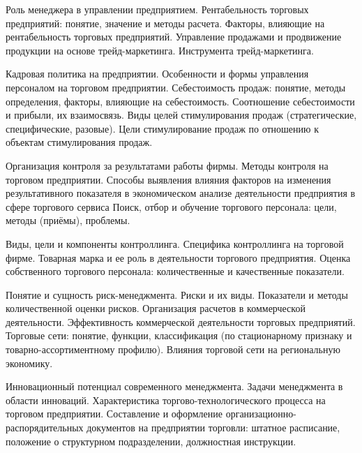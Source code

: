 \documentclass[
	11pt,
	a4paper,
	]
	{article}
\begin{document}
\bigskip

\noindent{} 
	{
		Роль менеджера в управлении предприятием.
	}{
		Рентабельность торговых предприятий: понятие, значение и методы расчета. Факторы, влияющие на рентабельность торговых предприятий.
	}{
		Управление продажами и продвижение продукции на основе трейд-маркетинга. Инструмента трейд-маркетинга.
	}

\bigskip

\noindent{} 
	{
		Кадровая политика на предприятии. Особенности и формы управления персоналом на торговом предприятии.
	}{
		Себестоимость продаж: понятие, методы определения, факторы, влияющие на себестоимость. Соотношение себестоимости и прибыли, их взаимосвязь.
	}{
		Виды целей стимулирования продаж (стратегические, специфические, разовые). Цели стимулирование продаж по отношению к объектам стимулирования продаж.
	}

\bigskip

\noindent{} 
	{
		Организация контроля за результатами работы фирмы. Методы контроля на торговом предприятии.
	}{
		Способы выявления влияния факторов на изменения результативного показателя в экономическом анализе деятельности предприятия в сфере торгового сервиса
	}{
		Поиск, отбор и обучение торгового персонала: цели, методы (приёмы), проблемы.
	}

\bigskip

\noindent{} 
	{
		Виды, цели и компоненты контроллинга. Специфика контроллинга на торговой фирме.
	}{
		Товарная марка и ее роль в деятельности торгового предприятия.
	}{
		Оценка собственного торгового персонала: количественные и качественные показатели.
	}

\bigskip

\noindent{} 
	{
		Понятие и сущность риск-менеджмента. Риски и их виды. Показатели и методы количественной оценки рисков.
	}{
		Организация расчетов в коммерческой деятельности. Эффективность коммерческой деятельности торговых предприятий.
	}{
		Торговые сети: понятие, функции, классификация (по стационарному признаку и товарно-ассортиментному профилю). Влияния торговой сети на региональную экономику.
	}

\bigskip

\noindent{} 
	{
		Инновационный потенциал современного менеджмента. Задачи менеджмента в области инноваций.
	}{
		Характеристика торгово-технологического процесса на торговом предприятии.
	}{
		Составление и оформление организационно-распорядительных документов на предприятии торговли: штатное расписание, положение о структурном подразделении, должностная инструкции.
	}
\end{document}
